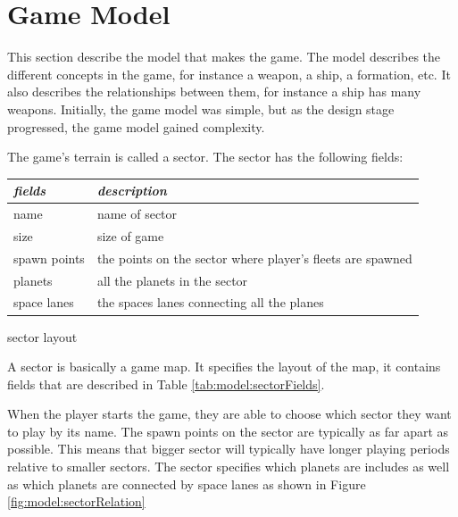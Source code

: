 \section{Game Model}

% 

This section describe the model that makes the game.
The model describes the different concepts in the game, for instance a weapon, a ship, a formation, etc.
It also describes the relationships between them, for instance a ship has many weapons.
Initially, the game model was simple, but as the design stage progressed, the game model gained complexity.

The game's terrain is called a sector. The sector has the following fields:
\begin{margintable}
    \begin{tabular}{p{3em} p{9em}}
    \toprule
    \emph{fields} & \emph{description} \\
    \midrule

    name & name of sector \\
    size & size of game \\
    spawn points & the points on the sector where player's fleets are spawned \\
    planets & all the planets in the sector \\
    space lanes & the spaces lanes connecting all the planes \\

    \bottomrule
    \end{tabular}
    	\vspace{1em}
	\caption{sector layout}
	\label{tab:model:sectorFields}
\end{margintable}

A sector is basically a game map.
It specifies the layout of the map, it contains fields that are described in Table \ref{tab:model:sectorFields}.

When the player starts the game, they are able to choose which sector they want to play by its name. 
The spawn points on the sector are typically as far apart as possible. 
This means that bigger sector will typically have longer playing periods relative to smaller sectors.
The sector specifies which planets are includes as well as which planets are connected by space lanes as shown in Figure \ref{fig:model:sectorRelation}

